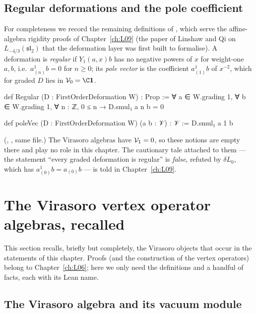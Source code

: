 \subsection{Regular deformations and the pole coefficient}

For completeness we record the remaining definitions of ,
which serve the affine-algebra rigidity proofs of Chapter~\ref{ch:L09} (the paper of Linshaw and Qi
on $L_{-4/3}(\mathfrak{sl}_2)$ that the deformation layer was first built to formalise). A
deformation is \emph{regular} if $Y_1(a,x)b$ has no negative powers of $x$ for weight-one $a,b$,
i.e.\ $a^1_{(n)}b = 0$ for $n\ge0$; its \emph{pole vector} is the coefficient $a^1_{(1)}b$ of
$x^{-2}$, which for graded $D$ lies in $\lsevenV_0 = \C\lsevenvac$.
\begin{leancode}
def Regular (D : FirstOrderDeformation W) : Prop :=
  ∀ a ∈ W.grading 1, ∀ b ∈ W.grading 1, ∀ n : ℤ, 0 ≤ n → D.smul₁ a n b = 0

def poleVec (D : FirstOrderDeformation W) (a b : 𝒱) : 𝒱 := D.smul₁ a 1 b
\end{leancode}
(, , same file.) The Virasoro
algebras have $\mathcal{V}_1 = 0$, so these notions are empty there and play no role in this chapter.
The cautionary tale attached to them --- the statement ``every graded deformation is regular'' is
\emph{false}, refuted by $\delta L_0$, which has $a^1_{(0)}b = a_{(0)}b$ --- is told in
Chapter~\ref{ch:L09}.

\section{The Virasoro vertex operator algebras, recalled}\label{l07:sec:virasoro}

This section recalls, briefly but completely, the Virasoro objects that occur in the statements
of this chapter. Proofs (and the construction of the vertex operators) belong to
Chapter~\ref{ch:L06}; here we only need the definitions and a handful of facts, each with its Lean
name.

\subsection{The Virasoro algebra and its vacuum module}

